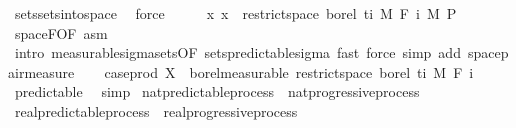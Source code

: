 \begin{isabellebody}
\ sets{\isachardot}{\kern0pt}sets{\isacharunderscore}{\kern0pt}into{\isacharunderscore}{\kern0pt}space\ \isamarkupfalse%
\ force\isanewline
\ \ \isamarkupfalse%
\ \isamarkupfalse%
\ {\isachardoublequoteopen}{\isacharparenleft}{\kern0pt}{\isasymlambda}x{\isachardot}{\kern0pt}\ x{\isacharparenright}{\kern0pt}\ {\isasymin}\ restrict{\isacharunderscore}{\kern0pt}space\ borel\ {\isacharbraceleft}{\kern0pt}ti{\isacharbraceright}{\kern0pt}\ {\isasymOtimes}\isactrlsub M\ F\ i\ {\isasymrightarrow}\isactrlsub M\ {\isasymSigma}\isactrlsub P{\isachardoublequoteclose}\ \isamarkupfalse%
\ space{\isacharunderscore}{\kern0pt}F{\isacharbrackleft}{\kern0pt}OF\ asm{\isacharbrackright}{\kern0pt}\ \isamarkupfalse%
\ {\isacharparenleft}{\kern0pt}intro\ measurable{\isacharunderscore}{\kern0pt}sigma{\isacharunderscore}{\kern0pt}sets{\isacharbrackleft}{\kern0pt}OF\ sets{\isacharunderscore}{\kern0pt}predictable{\isacharunderscore}{\kern0pt}sigma{\isacharbrackright}{\kern0pt}{\isacharparenright}{\kern0pt}\ {\isacharparenleft}{\kern0pt}fast{\isacharcomma}{\kern0pt}\ force\ simp\ add{\isacharcolon}{\kern0pt}\ space{\isacharunderscore}{\kern0pt}pair{\isacharunderscore}{\kern0pt}measure{\isacharparenright}{\kern0pt}\isanewline
\ \ \isamarkupfalse%
\ {\isachardoublequoteopen}case{\isacharunderscore}{\kern0pt}prod\ X\ {\isasymin}\ borel{\isacharunderscore}{\kern0pt}measurable\ {\isacharparenleft}{\kern0pt}restrict{\isacharunderscore}{\kern0pt}space\ borel\ {\isacharbraceleft}{\kern0pt}ti{\isacharbraceright}{\kern0pt}\ {\isasymOtimes}\isactrlsub M\ F\ i{\isacharparenright}{\kern0pt}{\isachardoublequoteclose}\ \isamarkupfalse%
\ predictable\ \isamarkupfalse%
\ simp\isanewline
{}\isamarkupfalse%
%
\endisatagproof
{\isafoldproof}%
%
\isadelimproof
\isanewline
%
\endisadelimproof
\isanewline
{}\isamarkupfalse%
\ nat{\isacharunderscore}{\kern0pt}predictable{\isacharunderscore}{\kern0pt}process\ {\isasymsubseteq}\ nat{\isacharunderscore}{\kern0pt}progressive{\isacharunderscore}{\kern0pt}process%
\isadelimproof
\ %
\endisadelimproof
%
\isatagproof
\isacommand{{\isachardot}{\kern0pt}{\isachardot}{\kern0pt}}\isamarkupfalse%
%
\endisatagproof
{\isafoldproof}%
%
\isadelimproof
%
\endisadelimproof
\isanewline
{}\isamarkupfalse%
\ real{\isacharunderscore}{\kern0pt}predictable{\isacharunderscore}{\kern0pt}process\ {\isasymsubseteq}\ real{\isacharunderscore}{\kern0pt}progressive{\isacharunderscore}{\kern0pt}process%

\end{isabellebody}
